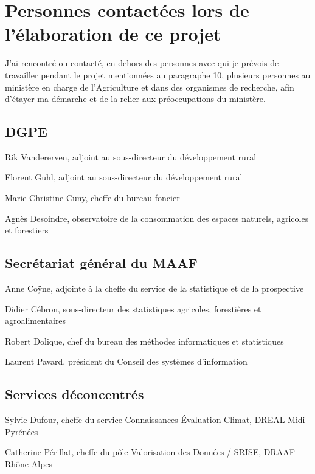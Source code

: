 \section
{Personnes contactées lors de l’élaboration de ce projet}

J’ai rencontré ou contacté, en dehors des personnes avec qui je prévois de travailler pendant le projet mentionnées au paragraphe 10, plusieurs personnes au ministère en charge de l’Agriculture et dans des organismes de recherche, afin d’étayer ma démarche et de la relier aux préoccupations du ministère.

\subsection{DGPE}

\startitemize[5,packed]
\item Rik Vandererven, adjoint au sous-directeur du développement rural
\item Florent Guhl, adjoint au sous-directeur du développement rural
\item Marie-Christine Cuny, cheffe du bureau foncier
\item Agnès Desoindre, observatoire de la consommation des espaces naturels, agricoles et forestiers
\stopitemize

\subsection{Secrétariat général du MAAF}

\startitemize[5,packed]
\item Anne Coÿne, adjointe à la cheffe du service de la statistique et de la prospective
\item Didier Cébron, sous-directeur des statistiques agricoles, forestières et agroalimentaires
\item Robert Dolique, chef du bureau des méthodes informatiques et statistiques
\item Laurent Pavard, président du Conseil des systèmes d’information
\stopitemize


\subsection{Services déconcentrés}

\startitemize[5,packed]
\item Sylvie Dufour, cheffe du service Connaissances Évaluation Climat, DREAL Midi-Pyrénées
\item Catherine Périllat, cheffe du pôle Valorisation des Données / SRISE, DRAAF Rhône-Alpes
\stopitemize



